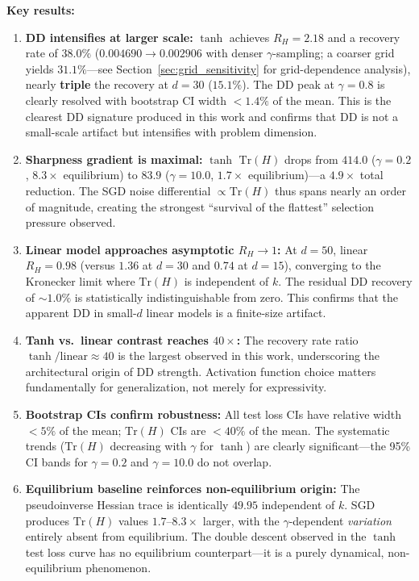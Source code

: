 \documentclass[
  journal=largetwo,
  simfonts=false,
  year=2025,
  volume=37,
]{cup-journal}
\begin{document}
\vspace{-6pt}
\textbf{Key results:}
\begin{enumerate}
    \item \textbf{DD intensifies at larger scale:} $\tanh$ achieves $R_H = 2.18$ and a recovery rate of $\mathbf{38.0\%}$ ($0.004690 \to 0.002906$ with denser $\gamma$-sampling; a coarser grid yields $31.1\%$---see Section~\ref{sec:grid_sensitivity} for grid-dependence analysis), nearly \textbf{triple} the recovery at $d=30$ ($15.1\%$). The DD peak at $\gamma=0.8$ is clearly resolved with bootstrap CI width $<1.4\%$ of the mean. This is the clearest DD signature produced in this work and confirms that DD is not a small-scale artifact but intensifies with problem dimension.
    
    \item \textbf{Sharpness gradient is maximal:} $\tanh$ $\mathrm{Tr}(H)$ drops from $414.0$ ($\gamma=0.2$, $8.3\times$ equilibrium) to $83.9$ ($\gamma=10.0$, $1.7\times$ equilibrium)---a $4.9\times$ total reduction. The SGD noise differential $\propto \mathrm{Tr}(H)$ thus spans nearly an order of magnitude, creating the strongest ``survival of the flattest'' selection pressure observed.
    
    \item \textbf{Linear model approaches asymptotic $R_H \to 1$:} At $d=50$, linear $R_H = 0.98$ (versus $1.36$ at $d=30$ and $0.74$ at $d=15$), converging to the Kronecker limit where $\mathrm{Tr}(H)$ is independent of $k$. The residual DD recovery of $\sim 1.0\%$ is statistically indistinguishable from zero. This confirms that the apparent DD in small-$d$ linear models is a finite-size artifact.
    
    \item \textbf{Tanh vs.\ linear contrast reaches $40\times$:} The recovery rate ratio $\tanh/\mathrm{linear} \approx 40$ is the largest observed in this work, underscoring the architectural origin of DD strength. Activation function choice matters fundamentally for generalization, not merely for expressivity.
    
    \item \textbf{Bootstrap CIs confirm robustness:} All test loss CIs have relative width $< 5\%$ of the mean; $\mathrm{Tr}(H)$ CIs are $< 40\%$ of the mean. The systematic trends ($\mathrm{Tr}(H)$ decreasing with $\gamma$ for $\tanh$) are clearly significant---the 95\% CI bands for $\gamma=0.2$ and $\gamma=10.0$ do not overlap.
    
    \item \textbf{Equilibrium baseline reinforces non-equilibrium origin:} The pseudoinverse Hessian trace is identically $49.95$ independent of $k$. SGD produces $\mathrm{Tr}(H)$ values $1.7$--$8.3\times$ larger, with the $\gamma$-dependent \emph{variation} entirely absent from equilibrium. The double descent observed in the $\tanh$ test loss curve has no equilibrium counterpart---it is a purely dynamical, non-equilibrium phenomenon.
\end{enumerate}
\end{document}
